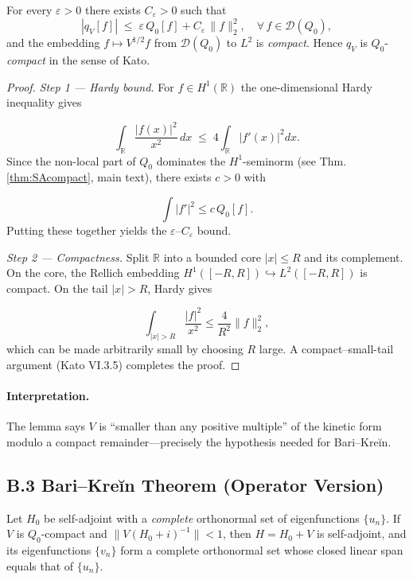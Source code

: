 \documentclass[11pt]{article}
\begin{document}
\begin{lemma}
\label{lem:B1}
For every $\varepsilon>0$ there exists $C_\varepsilon>0$ such that  
\[
    |q_{V}[f]|
    \;\le\;
    \varepsilon\,Q_{0}[f] + C_\varepsilon\,\|f\|^{2}_{2},
    \quad
    \forall\,f\in\mathcal D(Q_{0}),
\]
and the embedding  
\(f\mapsto V^{1/2}f\) from \(\mathcal D(Q_{0})\) to \(L^{2}\) is
\emph{compact}.  Hence \(q_{V}\) is \(Q_{0}\)-\emph{compact} in the
sense of Kato.
\end{lemma}

\begin{proof}\leavevmode  
\textit{Step 1 — Hardy bound.}  
For $f\in H^{1}(\mathbb R)$ the one-dimensional Hardy inequality gives  

\[
    \int_{\mathbb R} \frac{|f(x)|^{2}}{x^{2}}\,dx
    \;\le\;
    4\int_{\mathbb R} |f'(x)|^{2}dx.
\]
Since the non-local part of \(Q_{0}\) dominates the \(H^{1}\)-seminorm
(see Thm.\,\ref{thm:SAcompact}, main text), there exists $c>0$ with  

\[
   \int |f'|^{2}\le c\,Q_{0}[f].
\]
Putting these together yields the $\varepsilon$–$C_\varepsilon$ bound.

\textit{Step 2 — Compactness.}  
Split $\mathbb R$ into a bounded core $|x|\le R$ and its complement.
On the core, the Rellich embedding
$H^{1}([-R,R])\hookrightarrow L^{2}([-R,R])$ is compact.  
On the tail $|x|>R$, Hardy gives  

\[
   \int_{|x|>R}\frac{|f|^{2}}{x^{2}}\le \frac{4}{R^{2}}\|f\|^{2}_{2},
\]
which can be made arbitrarily small by choosing $R$ large.  
A compact–small-tail argument (Kato VI.3.5) completes the proof.
\end{proof}

\paragraph{Interpretation.}  
The lemma says \(V\) is “smaller than any positive multiple” of the
kinetic form modulo a compact remainder—precisely the hypothesis needed
for Bari–Kreĭn.

\vspace{0.8em}
\subsection*{B.3  Bari–Kreĭn Theorem (Operator Version)}

\begin{theorem}
\label{thm:BariKrein}
Let \(H_{0}\) be self-adjoint with a \emph{complete} orthonormal set of
eigenfunctions \(\{u_{n}\}\).
If \(V\) is \(Q_{0}\)-compact and \(\|V(H_{0}+i)^{-1}\|<1\), then  
\(H=H_{0}+V\) is self-adjoint, and its eigenfunctions
\(\{v_{n}\}\) form a complete orthonormal set whose closed linear span
equals that of \(\{u_{n}\}\).
\end{theorem}
\end{document}
